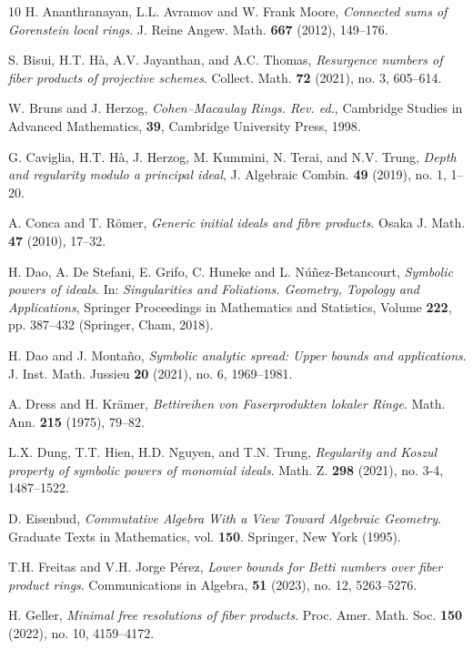 \documentclass{amsart}
\theoremstyle{plain}
\theoremstyle{definition}
\numberwithin{equation}{section}
\begin{document}
\begin{thebibliography}{10}
H. Ananthranayan, L.L. Avramov and W. Frank Moore,
\emph{Connected sums of Gorenstein local rings}.
 J. Reine Angew. Math. {\bf 667} (2012), 149--176. 
 
S. Bisui, H.T. H\`a, A.V. Jayanthan, and A.C. Thomas,
\emph{Resurgence numbers of fiber products of projective schemes}.
 Collect. Math. {\bf 72} (2021), no. 3, 605--614. 

W. Bruns and J. Herzog, 
{\it Cohen--Macaulay Rings. Rev. ed.}, 
Cambridge Studies in Advanced Mathematics, {\bf 39}, Cambridge University Press, 1998.

G. Caviglia, H.T. H\`a, J. Herzog, M. Kummini, N. Terai, and N.V. Trung,
\emph{Depth and regularity modulo a principal ideal}, 
J. Algebraic Combin. {\bf 49} (2019), no. 1, 1--20. 

A. Conca and T. R\"omer,
\emph{Generic initial ideals and fibre products}.
Osaka J. Math. {\bf 47} (2010), 17--32.

H. Dao, A. De Stefani, E. Grifo, C. Huneke and L. N\'u\~{n}ez-Betancourt, 
\emph{Symbolic powers of ideals}. In: \emph{Singularities and Foliations. Geometry, Topology and Applications},
Springer Proceedings in Mathematics and Statistics, Volume {\bf 222}, pp. 387–432 (Springer, Cham, 2018).


H. Dao and J. Monta\~{n}o,
\emph{Symbolic analytic spread: Upper bounds and applications}.
J. Inst. Math. Jussieu {\bf 20} (2021), no. 6, 1969--1981.

A. Dress and H. Kr\"amer, 
\emph{Bettireihen von Faserprodukten lokaler Ringe}.
Math. Ann. {\bf 215} (1975), 79--82.

L.X. Dung, T.T. Hien, H.D. Nguyen, and T.N. Trung,
\emph{Regularity and Koszul property of symbolic powers of monomial ideals}.
 Math. Z. {\bf 298} (2021), no. 3-4, 1487--1522. 
 
D. Eisenbud, 
\emph{Commutative Algebra With a View Toward Algebraic Geometry}. 
Graduate Texts in Mathematics, vol. {\bf 150}. Springer, New York (1995).

 
T.H. Freitas and V.H. Jorge P\'erez,
\emph{Lower bounds for Betti numbers over fiber product rings}. 
Communications in Algebra, {\bf 51} (2023), no. 12, 5263--5276. 
 
H. Geller, 
\emph{Minimal free resolutions of fiber products}. 
Proc. Amer. Math. Soc. {\bf 150} (2022), no. 10, 4159--4172.


\end{thebibliography}
\end{document}
